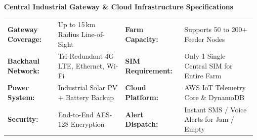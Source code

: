 \documentclass[10pt,a4paper]{article}
\begin{document}
\vspace{5pt}

{\fontsize{8.5}{10.5}\selectfont \textbf{\textcolor{NavyDark}{Central Industrial Gateway \& Cloud Infrastructure Specifications}}}
\vspace{2.5pt}

\begin{tcolorbox}[
  enhanced,
  colback=CardBg,
  colframe=TealPrimary,
  arc=2mm,
  boxrule=0.9pt,
  left=0pt, right=0pt, top=0pt, bottom=0pt
]
  \renewcommand{\arraystretch}{1.3}
  \fontsize{7.3}{9.2}\selectfont
  \begin{tabularx}{\linewidth}{@{}p{2.6cm} X p{2.6cm} X@{}}
    \rowcolor{TableStripe}
    \textbf{Gateway Coverage:} & Up to 15\,km Radius Line-of-Sight & \textbf{Farm Capacity:} & Supports 50 to 200+ Feeder Nodes\\
    \textbf{Backhaul Network:} & Tri-Redundant 4G LTE, Ethernet, Wi-Fi & \textbf{SIM Requirement:} & Only 1 Single Central SIM for Entire Farm\\
    \rowcolor{TableStripe}
    \textbf{Power System:} & Industrial Solar PV + Battery Backup & \textbf{Cloud Platform:} & AWS IoT Telemetry Core \& DynamoDB\\
    \textbf{Security:} & End-to-End AES-128 Encryption & \textbf{Alert Dispatch:} & Instant SMS / Voice Alerts for Jam / Empty\\
  \end{tabularx}
\end{tcolorbox}

\vspace{5pt}
\end{document}
